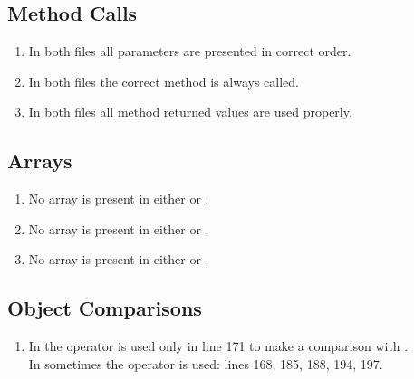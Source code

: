 \subsection{Method Calls}
\begin{enumerate}[NUM]
    \item In both files all parameters are presented in correct order.
  
    \item In both files the correct method is always called.
    
    \item In both files all method returned values are used properly.

\end{enumerate}

\subsection{Arrays}
\begin{enumerate}[NUM]
    \item No array is present in either  or .
   
    \item No array is present in either  or .
    
    \item No array is present in either  or .
\end{enumerate}

\subsection{Object Comparisons}
\begin{enumerate}[NUM]
    \item In  the \code{==} operator is used only in line 171 to make a comparison with .\\
    In  sometimes the \code{==} operator is used: lines 168, 185, 188, 194, 197.
\end{enumerate}

